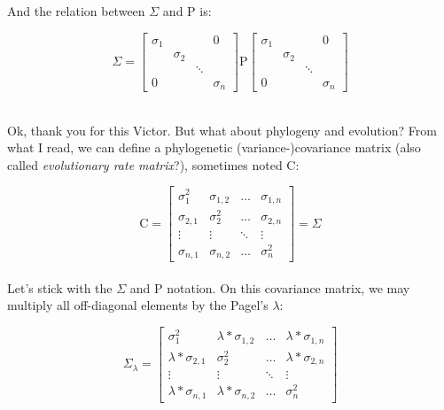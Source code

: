 \documentclass{article}
\newcommand{\Rho}{\mathrm{P}}
\begin{document}
\noindent And the relation between $\Sigma$ and $\Rho$ is:

\begin{equation*}
	\Sigma = 
	\begin{bmatrix}
		\sigma_1 &&& 0 \\
		& \sigma_2 \\
		&& \ddots \\
		0 &&& \sigma_n
	\end{bmatrix}
	\Rho
	\begin{bmatrix}
		\sigma_1 &&& 0 \\
		& \sigma_2 \\
		&& \ddots \\
		0 &&& \sigma_n
	\end{bmatrix}
\end{equation*}\\

\newpage

\noindent Ok, thank you for this Victor. But what about phylogeny and evolution?
From what I read, we can define a phylogenetic (variance-)covariance matrix (also  called \emph{evolutionary rate matrix}?), sometimes noted C:

\begin{equation*}
	\mathrm{C} = 
	\begin{bmatrix}
		\sigma^2_{1} & \sigma_{1,2} & \ldots & \sigma_{1,n} \\
		\sigma_{2,1} & \sigma^2_{2} & \ldots  & \sigma_{2,n}  \\
		\vdots & \vdots & \ddots & \vdots \\
		\sigma_{n,1} & \sigma_{n,2}  &  \ldots & \sigma^2_{n}
	\end{bmatrix}
	= \Sigma
\end{equation*}\\

\noindent Let's stick with the $\Sigma$ and $\Rho$ notation. On this covariance matrix, we may multiply all off-diagonal elements by the Pagel's $\lambda$:

\begin{equation*}
	\Sigma_{\lambda} =
	\begin{bmatrix}
		\sigma^2_{1} & \lambda*\sigma_{1,2} & \ldots & \lambda*\sigma_{1,n} \\
		\lambda*\sigma_{2,1} & \sigma^2_{2} & \ldots  & \lambda*\sigma_{2,n}  \\
		\vdots & \vdots & \ddots & \vdots \\
		\lambda*\sigma_{n,1} & \lambda*\sigma_{n,2}  &  \ldots & \sigma^2_{n}
	\end{bmatrix}
\end{equation*}\\
\end{document}
